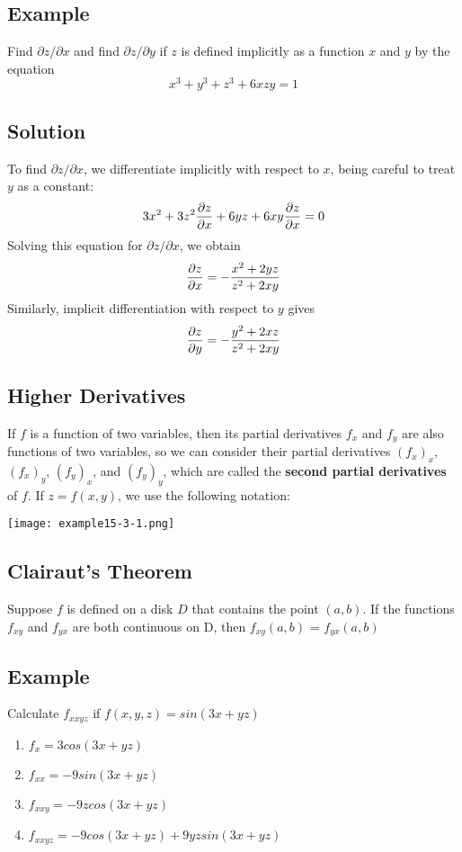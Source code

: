 \subsection*{Example}
Find $\partial z/\partial x$ and find $\partial z/\partial y$ if $z$ is defined implicitly
as a function $x$ and $y$ by the equation
$$x^3+y^3+z^3+6xzy=1$$

\subsection*{Solution}
To find $\partial z/\partial x$, we differentiate implicitly with respect to $x$,
being careful to treat $y$ as a constant:
$$3x^2+3z^2\pdv{z}{x}+6yz+6xy\pdv{z}{x}=0$$
Solving this equation for $\partial z/\partial x$, we obtain
$$\pdv{z}{x}=-\frac{x^2+2yz}{z^2+2xy}$$
Similarly, implicit differentiation with respect to $y$ gives
$$\pdv{z}{y}=-\frac{y^2+2xz}{z^2+2xy}$$

\subsection*{Higher Derivatives}
If $f$ is a function of two variables, then its partial derivatives $f_x$ and $f_y$
are also functions of two variables, so we can consider their partial derivatives
$(f_x)_x$, $(f_x)_y$, $(f_y)_x$, and $(f_y)_y$, which are called the \textbf{second
    partial derivatives} of $f$. If $z=f(x,y)$, we use the following notation:
\begin{center}
    \texttt{[image: example15-3-1.png]}
\end{center}

\subsection*{Clairaut's Theorem}
Suppose $f$ is defined on a disk $D$ that contains the point $(a, b)$.
If the functions $f_{xy}$ and $f_{yx}$ are both continuous on D, then
$f_{xy}(a, b)$ = $f_{yx}(a, b)$

\subsection*{Example}
Calculate $f_{xxyz}$ if $f(x, y, z) = sin(3x + yz)$
\begin{enumerate}
    \item[] $f_x = 3cos(3x + yz)$
    \item[] $f_{xx} = -9sin(3x + yz)$
    \item[] $f_{xxy} = -9zcos(3x + yz)$
    \item[] $f_{xxyz} = -9cos(3x + yz) + 9yzsin(3x + yz)$
\end{enumerate}

